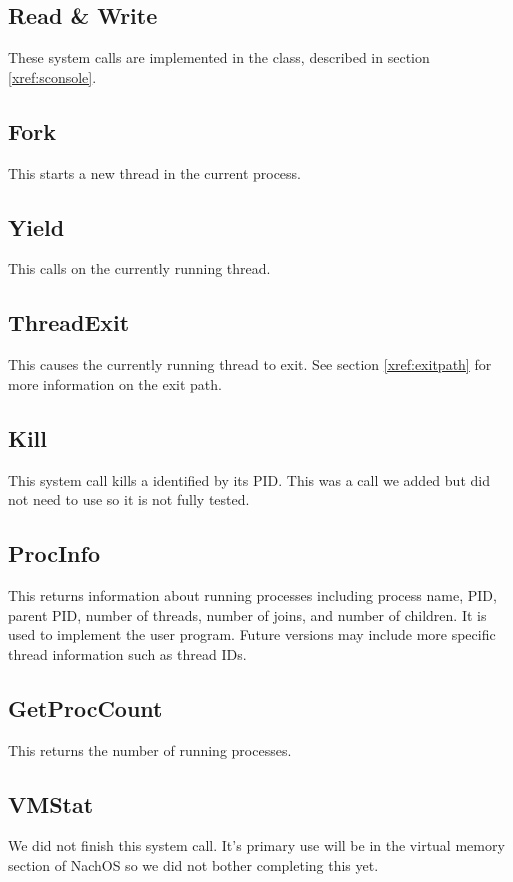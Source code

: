     \subsection{Read \& Write}
      These system calls are implemented in the  class, described in
      section \ref{xref:sconsole}.

    \subsection{Fork}
      This starts a new thread in the current process.

    \subsection{Yield}
      This calls  on the currently running thread.

    \subsection{ThreadExit}
      This causes the currently running thread to exit. See section \ref{xref:exitpath}
      for more information on the exit path.

    \subsection{Kill}
      This system call kills a  identified by its PID. This was a call we
      added but did not need to use so it is not fully tested.

    \subsection{ProcInfo}
      This returns information about running processes including process name, PID,
      parent PID, number of threads, number of joins, and number of children. It is used
      to implement the  user program. Future versions may include more specific
      thread information such as thread IDs.

    \subsection{GetProcCount}
      This returns the number of running processes.

    \subsection{VMStat}
      We did not finish this system call. It's primary use will be in the virtual memory
      section of NachOS so we did not bother completing this yet.

